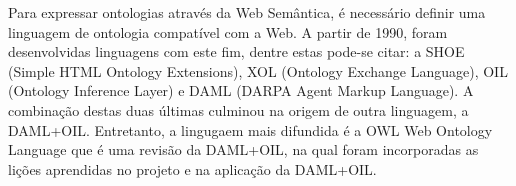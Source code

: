 





Para expressar ontologias através da Web Semântica, é necessário definir uma linguagem de ontologia compatível com a Web. A partir de 1990, foram desenvolvidas linguagens com este fim, dentre estas pode-se citar: a SHOE (Simple HTML Ontology Extensions), XOL (Ontology Exchange Language), OIL (Ontology Inference Layer) e DAML (DARPA Agent Markup Language). A combinação destas duas últimas culminou na origem de outra linguagem, a DAML+OIL. Entretanto, a lingugaem mais difundida é a OWL Web Ontology Language que é uma revisão da DAML+OIL, na qual foram incorporadas as lições aprendidas no projeto e na aplicação da DAML+OIL\cite{Harmelen04}.


